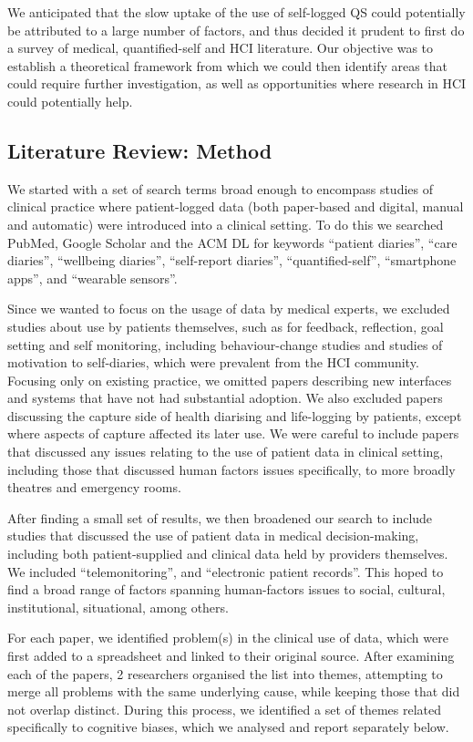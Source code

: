 \documentclass{sigchi}
\begin{document}
We anticipated that the slow uptake of the use of self-logged QS could potentially be attributed to a large number of factors, and thus decided it prudent to first do a survey of medical, quantified-self and HCI literature.  Our objective  was to establish a theoretical framework from which we could then identify areas that could require further investigation, as well as opportunities where research in HCI could potentially help.  

\subsection{Literature Review: Method}

We started with a set of search terms broad enough to encompass studies of clinical practice where patient-logged data (both paper-based and digital, manual and automatic) were introduced into a clinical setting.  To do this we searched PubMed, Google Scholar and the ACM DL for keywords ``patient diaries'', ``care diaries'', ``wellbeing diaries'', ``self-report diaries'', ``quantified-self'', ``smartphone apps'', and ``wearable sensors''.

Since we wanted to focus on the usage of data by medical experts, we excluded studies about use by patients themselves, such as for feedback, reflection, goal setting and self monitoring, including behaviour-change studies and studies of motivation to self-diaries, which were prevalent from the HCI community.   Focusing only on existing practice, we omitted papers describing new interfaces and systems that have not had substantial adoption.  We also excluded papers discussing the capture side of health diarising and life-logging by patients, except where aspects of capture affected its later use.  We were careful to include papers that discussed any issues relating to the use of patient data in clinical setting, including those that discussed human factors issues specifically, to more broadly  theatres and emergency rooms.

After finding a small set of results, we then broadened our search to include studies that discussed the use of patient data in medical decision-making, including both patient-supplied and clinical data held by providers themselves.  We included ``telemonitoring'', and ``electronic patient records''.  This  hoped to find a broad range of factors spanning human-factors issues to social, cultural, institutional, situational, among others.

For each paper, we identified problem(s) in the clinical use of data, which were first added to a spreadsheet and linked to their original source.  After examining each of the papers, 2 researchers organised the list into themes, attempting to merge all problems with the same underlying cause, while keeping those that did not overlap distinct.  During this process, we identified a set of themes related specifically to cognitive biases, which we analysed and report separately below.
\end{document}
